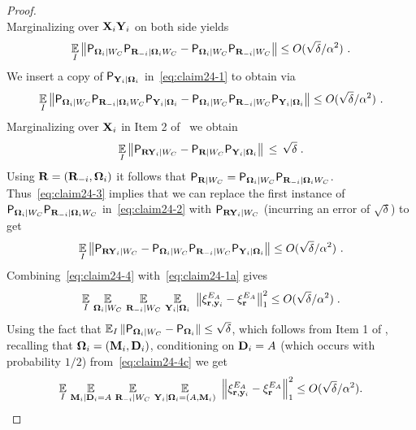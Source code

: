 \begin{proof}
\[\]
Marginalizing over $\mathbf{X}_i \mathbf{Y}_i$ on both side yields
\begin{equation}\label{eq:claim24-1}
\operatorname*{\mathbb{E}}_I \left \| \mathsf{P}_{{\boldsymbol{\Omega}}_i | W_C} \mathsf{P}_{\mathbf{R}_{-i} | {\boldsymbol{\Omega}}_i  W_C} -  \mathsf{P}_{{\boldsymbol{\Omega}}_i | W_C} \mathsf{P}_{\mathbf{R}_{-i} | W_C} \right \| \leq O(\sqrt{\delta}/\alpha^2)~.
\end{equation}
We insert a copy of $\mathsf{P}_{\mathbf{Y}_i | {\boldsymbol{\Omega}}_i }$ in~\eqref{eq:claim24-1} to obtain via 
\begin{equation}\label{eq:claim24-2}
\operatorname*{\mathbb{E}}_I \left \| \mathsf{P}_{{\boldsymbol{\Omega}}_i | W_C}\mathsf{P}_{\mathbf{R}_{-i} | {\boldsymbol{\Omega}}_i  W_C} \mathsf{P}_{\mathbf{Y}_i | {\boldsymbol{\Omega}}_i }  - \mathsf{P}_{{\boldsymbol{\Omega}}_i | W_C} \mathsf{P}_{\mathbf{R}_{-i} | W_C}  \mathsf{P}_{\mathbf{Y}_i | {\boldsymbol{\Omega}}_i } \right \| \leq O(\sqrt{\delta}/\alpha^2)~.
\end{equation}
Marginalizing over $\mathbf{X}_i$ in Item 2 of~ we obtain
\begin{equation}\label{eq:claim24-3}
\operatorname*{\mathbb{E}}_{I} \big\|\mathsf{P}_{\mathbf{R} \mathbf{Y}_i | W_C} - \mathsf{P}_{\mathbf{R} | W_C} \mathsf{P}_{\mathbf{Y}_i | {\boldsymbol{\Omega}}_i }\big\| \,\leq\,\sqrt{\delta}\;.
\end{equation}
Using $\mathbf{R} = (\mathbf{R}_{-i},{\boldsymbol{\Omega}}_i)$ it follows that $\mathsf{P}_{\mathbf{R} | W_C}=\mathsf{P}_{{\boldsymbol{\Omega}}_i | W_C} \mathsf{P}_{\mathbf{R}_{-i} | {\boldsymbol{\Omega}}_i  W_C}$. Thus~\eqref{eq:claim24-3} implies that we can replace the first instance of $\mathsf{P}_{{\boldsymbol{\Omega}}_i | W_C} \mathsf{P}_{\mathbf{R}_{-i} | {\boldsymbol{\Omega}}_i  W_C}$ in~\eqref{eq:claim24-2} with $\mathsf{P}_{\mathbf{R} \mathbf{Y}_i | W_C}$ (incurring an error of $\sqrt{\delta}$) to get
\begin{equation}\label{eq:claim24-4}
\operatorname*{\mathbb{E}}_I \left \| \mathsf{P}_{\mathbf{R} \mathbf{Y}_i | W_C} -\mathsf{P}_{{\boldsymbol{\Omega}}_i | W_C} \mathsf{P}_{\mathbf{R}_{-i} | W_C}  \mathsf{P}_{\mathbf{Y}_i | {\boldsymbol{\Omega}}_i }  \right \| \leq O(\sqrt{\delta}/\alpha^2)~.
\end{equation}
Combining~\eqref{eq:claim24-4} with~\eqref{eq:claim24-1a} gives
\begin{equation}\label{eq:claim24-4c}
	\operatorname*{\mathbb{E}}_I \, \operatorname*{\mathbb{E}}_{{\boldsymbol{\Omega}}_i | W_C} \, \operatorname*{\mathbb{E}}_{\mathbf{R}_{-i} | W_C} \, \operatorname*{\mathbb{E}}_{\mathbf{Y}_i | {\boldsymbol{\Omega}}_i} \,\, \big \| \xi^{E_A}_{\mathbf{r},\mathbf{y}_i} -  \xi^{E_A}_{\mathbf{r}} \big \|_1^2 \leq O(\sqrt{\delta}/\alpha^2)\;.
\end{equation}
Using the fact that $\operatorname*{\mathbb{E}}_I \| \mathsf{P}_{{\boldsymbol{\Omega}}_i | W_C} - \mathsf{P}_{{\boldsymbol{\Omega}}_i} \| \leq \sqrt{\delta}$, which follows from Item 1 of , recalling that ${\boldsymbol{\Omega}}_i = (\mathbf{M}_i,\mathbf{D}_i)$, conditioning on $\mathbf{D}_i = A$ (which occurs with probability $1/2$) from~\eqref{eq:claim24-4c} we get
\begin{equation}\label{eq:claim24-4d}
	\Ex_I \, \Ex_{\bM_i | \bD_i =A} \, \Ex_{\bR_\mi | W_C} \, \Ex_{\bY_i | \bOmega_i=(A,\bM_i)} \,\, \Big \| \xi^{E_A}_{\br,\by_i} -  \xi^{E_A}_{\br} \Big \|_1^2 \leq O(\sqrt{\delta}/\alpha^2).

\end{equation}
\end{proof}

